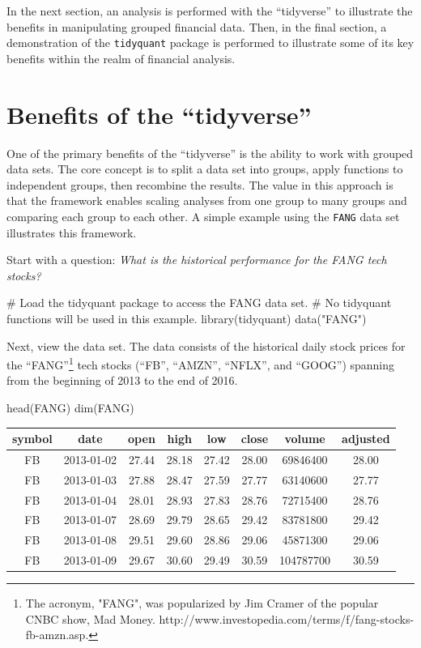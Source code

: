 In the next section, an analysis is performed with the ``tidyverse'' to
illustrate the benefits in manipulating grouped financial data. Then, in
the final section, a demonstration of the \texttt{tidyquant} package is
performed to illustrate some of its key benefits within the realm of
financial analysis.

\section{\texorpdfstring{Benefits of the
``tidyverse''}{Benefits of the tidyverse}}\label{benefits-of-the-tidyverse}

One of the primary benefits of the ``tidyverse'' is the ability to work
with grouped data sets. The core concept is to split a data set into
groups, apply functions to independent groups, then recombine the
results. The value in this approach is that the framework enables
scaling analyses from one group to many groups and comparing each group
to each other. A simple example using the \texttt{FANG} data set
illustrates this framework.

Start with a question: \emph{What is the historical performance for the
FANG tech stocks?}

\begin{Schunk}
\begin{Sinput}
# Load the tidyquant package to access the FANG data set.
# No tidyquant functions will be used in this example.
library(tidyquant) 
data("FANG")       
\end{Sinput}
\end{Schunk}

Next, view the data set. The data consists of the historical daily stock
prices for the
``FANG''\footnote{The acronym, "FANG", was popularized by Jim Cramer of the popular CNBC show, Mad Money. http://www.investopedia.com/terms/f/fang-stocks-fb-amzn.asp.}
tech stocks (``FB'', ``AMZN'', ``NFLX'', and ``GOOG'') spanning from the
beginning of 2013 to the end of 2016.

\begin{Schunk}
\begin{Sinput}
head(FANG)
dim(FANG)
\end{Sinput}
\end{Schunk}

\begin{tabular}{cccccccc}
\toprule
symbol & date & open & high & low & close & volume & adjusted\\
\midrule
FB & 2013-01-02 & 27.44 & 28.18 & 27.42 & 28.00 & 69846400 & 28.00\\
FB & 2013-01-03 & 27.88 & 28.47 & 27.59 & 27.77 & 63140600 & 27.77\\
FB & 2013-01-04 & 28.01 & 28.93 & 27.83 & 28.76 & 72715400 & 28.76\\
FB & 2013-01-07 & 28.69 & 29.79 & 28.65 & 29.42 & 83781800 & 29.42\\
FB & 2013-01-08 & 29.51 & 29.60 & 28.86 & 29.06 & 45871300 & 29.06\\
FB & 2013-01-09 & 29.67 & 30.60 & 29.49 & 30.59 & 104787700 & 30.59\\
\bottomrule
\end{tabular}

